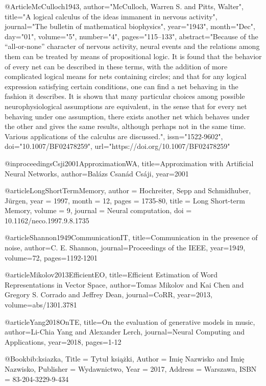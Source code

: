 @Article{McCulloch1943,
author="McCulloch, Warren S.
and Pitts, Walter",
title="A logical calculus of the ideas immanent in nervous activity",
journal="The bulletin of mathematical biophysics",
year="1943",
month="Dec",
day="01",
volume="5",
number="4",
pages="115--133",
abstract="Because of the ``all-or-none'' character of nervous activity, neural events and the relations among them can be treated by means of propositional logic. It is found that the behavior of every net can be described in these terms, with the addition of more complicated logical means for nets containing circles; and that for any logical expression satisfying certain conditions, one can find a net behaving in the fashion it describes. It is shown that many particular choices among possible neurophysiological assumptions are equivalent, in the sense that for every net behaving under one assumption, there exists another net which behaves under the other and gives the same results, although perhaps not in the same time. Various applications of the calculus are discussed.",
issn="1522-9602",
doi="10.1007/BF02478259",
url="https://doi.org/10.1007/BF02478259"
}

@inproceedings{Csji2001ApproximationWA,
  title={Approximation with Artificial Neural Networks},
  author={Bal{\'a}zs Csan{\'a}d Cs{\'a}ji},
  year={2001}
}

@article{LongShortTermMemory,
author = {Hochreiter, Sepp and Schmidhuber, Jürgen},
year = {1997},
month = {12},
pages = {1735-80},
title = {Long Short-term Memory},
volume = {9},
journal = {Neural computation},
doi = {10.1162/neco.1997.9.8.1735}
}

@article{Shannon1949CommunicationIT,
  title={Communication in the presence of noise},
  author={C. E. Shannon},
  journal={Proceedings of the IEEE},
  year={1949},
  volume={72},
  pages={1192-1201}
}

@article{Mikolov2013EfficientEO,
  title={Efficient Estimation of Word Representations in Vector Space},
  author={Tomas Mikolov and Kai Chen and Gregory S. Corrado and Jeffrey Dean},
  journal={CoRR},
  year={2013},
  volume={abs/1301.3781}
}

@article{Yang2018OnTE,
  title={On the evaluation of generative models in music},
  author={Li-Chia Yang and Alexander Lerch},
  journal={Neural Computing and Applications},
  year={2018},
  pages={1-12}
}

@Book{bib:ksiazka,
Title                    = {Tytu{\l} ksi{\k{a}}{\.{z}}ki},
Author                   = {Imi{\k{e}} Nazwisko and Imi{\k{e}} Nazwisko},
Publisher                = {Wydawnictwo},
Year                     = {2017},
Address                  = {Warszawa},
ISBN                     = {83-204-3229-9-434}
}

